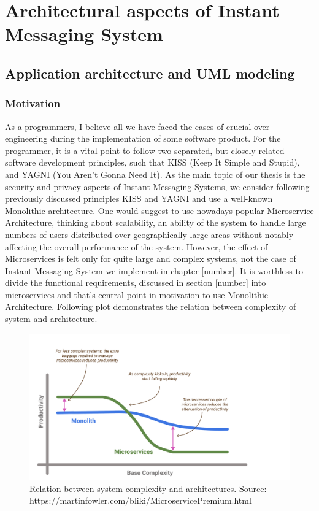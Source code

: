 \chapter{Architectural aspects of Instant Messaging System}\label{ch:secure-ims-implementation}


\section{Application architecture and UML modeling}\label{sec:application-architecture-and-uml-modeling}

\subsection{Motivation}\label{subsec:motivation}
As a programmers, I believe all we have faced the cases of crucial over-engineering during the implementation of some software product.
For the programmer, it is a vital point to follow two separated, but closely related software development principles, such that
KISS (Keep It Simple and Stupid), and YAGNI (You Aren't Gonna Need It).
As the main topic of our thesis is the security and privacy aspects of Instant Messaging Systems, we consider following
previously discussed principles KISS and YAGNI and use a well-known Monolithic architecture.
One would suggest to use nowadays popular Microservice Architecture, thinking about scalability,
an ability of the system to handle large numbers of users distributed over geographically large areas without notably affecting
the overall performance of the system.
However, the effect of Microservices is felt only for quite large and complex systems, not the case of Instant Messaging System
we implement in chapter [number].
It is worthless to divide the functional requirements, discussed in section [number] into microservices and that's central point
in motivation to use Monolithic Architecture.
Following plot demonstrates the relation between complexity of system and architecture.

\begin{figure}[H]
    \centering
    \includegraphics[width=1\textwidth]{Pictures/Monolith_vs_Microservice.pdf}
    \caption{Relation between system complexity and architectures. Source: https://martinfowler.com/bliki/MicroservicePremium.html}
    \label{fig:monolith_vs_microservice}
\end{figure}

